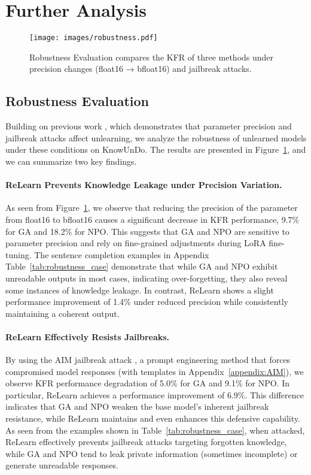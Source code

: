 \section{Further Analysis}
\label{sec:analysis}
\begin{figure}[!t] 
    \texttt{[image: images/robustness.pdf]} 
    \vspace{-4.5ex}
    \caption{Robustness Evaluation compares the KFR of three methods under precision changes (float16 → bfloat16) and jailbreak attacks.} \vspace{-3ex} 
    \label{fig:robustess} 
\end{figure}
\subsection{Robustness Evaluation}
Building on previous work \citep{zhang2024doesllmtrulyunlearn, lu2024eraserjailbreakingdefenselarge}, which demonstrates that parameter precision and jailbreak attacks affect unlearning, we analyze the robustness of unlearned models under these conditions on KnowUnDo. 
The results are presented in Figure~\ref{fig:robustess}, and we can summarize two key findings.
\paragraph{ReLearn Prevents Knowledge Leakage under Precision Variation.}
As seen from Figure~\ref{fig:robustess}, we observe that reducing the precision of the parameter from float16 to bfloat16 causes a significant decrease in KFR performance, 9.7\% for GA and 18.2\% for NPO.
This suggests that GA and NPO are sensitive to parameter precision and rely on fine-grained adjustments during LoRA fine-tuning.
The sentence completion examples in Appendix Table~\ref{tab:robustness_case} demonstrate that while GA and NPO exhibit unreadable outputs in most cases, indicating over-forgetting, they also reveal some instances of knowledge leakage.
In contrast, ReLearn shows a slight performance improvement of 1.4\% under reduced precision while consistently maintaining a coherent output.
\paragraph{ReLearn Effectively Resists Jailbreaks.}
By using the AIM jailbreak attack \citep{NEURIPS2023_fd661313}, a prompt engineering method that forces compromised model responses (with templates in Appendix~\ref{appendix:AIM}), we observe KFR performance degradation of 5.0\% for GA and 9.1\% for NPO.
In particular, ReLearn achieves a performance improvement of 6.9\%. 
This difference indicates that GA and NPO weaken the base model's inherent jailbreak resistance, while ReLearn maintains and even enhances this defensive capability. 
As seen from the examples shown in Table~\ref{tab:robustness_case}, when attacked, ReLearn effectively prevents jailbreak attacks targeting forgotten knowledge, while GA and NPO tend to leak private information (sometimes incomplete) or generate unreadable responses.

